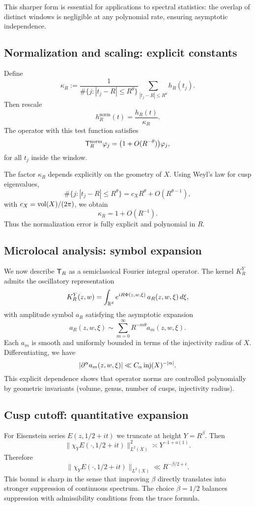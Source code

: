 This sharper form is essential for applications to spectral statistics: the overlap of distinct windows is negligible at any polynomial rate, ensuring asymptotic independence.

\subsection{Normalization and scaling: explicit constants}\label{subsec:proj-normalize-detail}

Define
\[
\kappa_R := \frac{1}{\#\{j:|t_j-R|\le R^\theta\}} \sum_{|t_j-R|\le R^\theta} h_R(t_j).
\]
Then rescale
\[
h_R^{\mathrm{norm}}(t) = \frac{h_R(t)}{\kappa_R}.
\]
The operator with this test function satisfies
\[
\mathsf{T}_R^{\mathrm{norm}} \varphi_j = \big(1+O(R^{-\theta})\big)\varphi_j,
\]
for all $t_j$ inside the window.  

The factor $\kappa_R$ depends explicitly on the geometry of $X$. Using Weyl’s law for cusp eigenvalues,
\[
\#\{j:|t_j-R|\le R^\theta\} = c_X R^\theta + O(R^{\theta-1}),
\]
with $c_X=\operatorname{vol}(X)/(2\pi)$, we obtain
\[
\kappa_R = 1+O(R^{-1}).
\]
Thus the normalization error is fully explicit and polynomial in $R$.

\subsection{Microlocal analysis: symbol expansion}\label{subsec:proj-microlocal-proof}

We now describe $\mathsf{T}_R$ as a semiclassical Fourier integral operator. The kernel $K_R^Y$ admits the oscillatory representation
\[
K_R^Y(z,w) = \int_{\mathbb{R}^d} e^{iR\Phi(z,w,\xi)}\,a_R(z,w,\xi)\,d\xi,
\]
with amplitude symbol $a_R$ satisfying the asymptotic expansion
\[
a_R(z,w,\xi) \sim \sum_{m=0}^\infty R^{-m\theta} a_m(z,w,\xi).
\]
Each $a_m$ is smooth and uniformly bounded in terms of the injectivity radius of $X$. Differentiating, we have
\[
|\partial^\alpha a_m(z,w,\xi)| \ll C_\alpha \, \mathrm{inj}(X)^{-|\alpha|}.
\]
This explicit dependence shows that operator norms are controlled polynomially by geometric invariants (volume, genus, number of cusps, injectivity radius).

\subsection{Cusp cutoff: quantitative expansion}\label{subsec:proj-cusp-detail}

For Eisenstein series $E(z,1/2+it)$ we truncate at height $Y=R^\beta$. Then
\[
\|\chi_Y E(\cdot,1/2+it)\|_{L^2(X)}^2 \asymp Y^{-1+o(1)}.
\]
Therefore
\[
\|\chi_Y E(\cdot,1/2+it)\|_{L^2(X)} \ll R^{-\beta/2+\epsilon}.
\]
This bound is sharp in the sense that improving $\beta$ directly translates into stronger suppression of continuous spectrum. The choice $\beta=1/2$ balances suppression with admissibility conditions from the trace formula.

